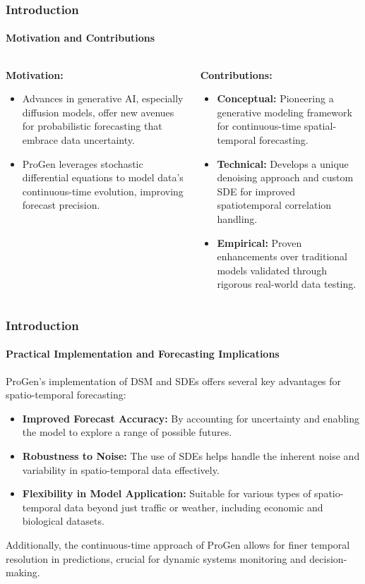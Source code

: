 \documentclass[light]{lutbeamer} %
\begin{document}
\begin{frame}
    \frametitle{Introduction}
    \framesubtitle{Motivation and Contributions}

    \begin{columns}[T]
        \begin{column}{0.48\textwidth}
            \textbf{Motivation:}
            \begin{itemize}
                \item Advances in generative AI, especially diffusion models, offer new avenues for probabilistic forecasting that embrace data uncertainty.
                \item ProGen leverages stochastic differential equations to model data’s continuous-time evolution, improving forecast precision.
            \end{itemize}
        \end{column}
        \begin{column}{0.48\textwidth}
            \textbf{Contributions:}
            \begin{itemize}
                \item \textbf{Conceptual:} Pioneering a generative modeling framework for continuous-time spatial-temporal forecasting.
                \item \textbf{Technical:} Develops a unique denoising approach and custom SDE for improved spatiotemporal correlation handling.
                \item \textbf{Empirical:} Proven enhancements over traditional models validated through rigorous real-world data testing.
            \end{itemize}
        \end{column}
    \end{columns}
\end{frame}


\begin{frame}
    \frametitle{Introduction}
    \framesubtitle{Practical Implementation and Forecasting Implications}

    ProGen's implementation of DSM and SDEs offers several key advantages for spatio-temporal forecasting:
    \begin{itemize}
        \item \textbf{Improved Forecast Accuracy:} By accounting for uncertainty and enabling the model to explore a range of possible futures.
        \item \textbf{Robustness to Noise:} The use of SDEs helps handle the inherent noise and variability in spatio-temporal data effectively.
        \item \textbf{Flexibility in Model Application:} Suitable for various types of spatio-temporal data beyond just traffic or weather, including economic and biological datasets.
    \end{itemize}
    Additionally, the continuous-time approach of ProGen allows for finer temporal resolution in predictions, crucial for dynamic systems monitoring and decision-making.
\end{frame}
\end{document}
